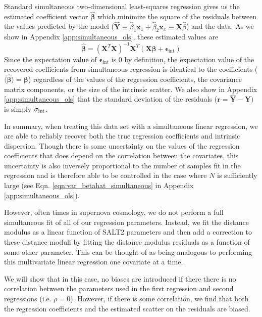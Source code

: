 Standard simultaneous two-dimensional least-squares regression gives us the estimated coefficient vector $\bm{\hat{\beta}}$ which minimize the square of the residuals between the values predicted by the model ($\bm{\hat{Y}} \equiv \hat{\beta}_1\bm{x}_1 + \hat{\beta}_2\bm{x}_x \equiv \bm{X}\hat{\beta}$) and the data. As we show in Appendix \ref{app:simultaneous_ols}, these estimated values are
\begin{equation}
    \bm{\hat{\beta}} = (\bm{X}^T\bm{X})^{-1}\bm{X}^T(\bm{X\beta} + \bm{\epsilon}_\text{int})
\label{eqn:sim_beta_vec}
\end{equation}
Since the expectation value of $\bm{\epsilon}_\text{int}$ is 0 by definition, the expectation value of the recovered coefficients from simultaneous regression is identical to the coefficients ($\langle\bm{\hat{\beta}}\rangle=\bm{\beta}$) regardless of the values of the regression coefficients, the covariance matrix components, or the size of the intrinsic scatter. We also show in Appendix \ref{app:simultaneous_ols} that the standard deviation of the residuals ($\bm{r}=\bm{\hat{Y}}-\bm{Y})$ is simply $\sigma_{\text{int}}$.

In summary, when treating this data set with a simultaneous linear regression, we are able to reliably recover both the true regression coefficients and intrinsic dispersion. Though there is some uncertainty on the values of the regression coefficients that does depend on the correlation between the covariates, this uncertainty is also inversely proportional to the number of samples fit in the regression and is therefore able to be controlled in the case where $N$ is sufficiently large (see Eqn. \ref{eqn:var_betahat_simultaneous} in Appendix \ref{app:simultaneous_ols}).

However, often times in supernova cosmology, we do not perform a full simultaneous fit of all of our regression parameters. Instead, we fit the distance modulus as a linear function of SALT2 parameters and then add a correction to these distance moduli by fitting the distance modulus residuals as a function of some other parameter. This can be thought of as being analogous to performing this multivariate linear regression one covariate at a time.

We will show that in this case, no biases are introduced if there there is no correlation between the parameters used in the first regression and second regressions (i.e. $\rho=0$). However, if there is some correlation, we find that both the regression coefficients and the estimated scatter on the residuals are biased.

